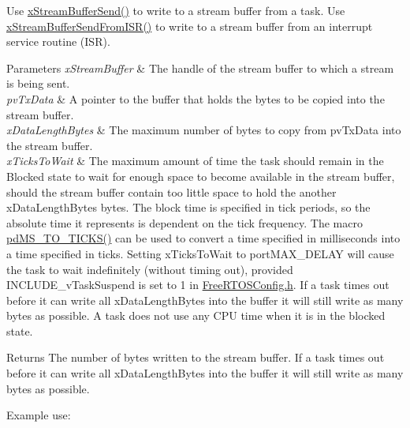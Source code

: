 \begin{DoxyPre}
\begin{DoxyPre}   Use \hyperlink{stream__buffer_8h_a35cdf3b6bf677086b9128782f762499d}{xStreamBufferSend()} to write to a stream buffer from a task.  Use
   \hyperlink{stream__buffer_8h_a1dab226e99230e01e79bc2b5c0605e44}{xStreamBufferSendFromISR()} to write to a stream buffer from an interrupt
   service routine (ISR).\end{DoxyPre}
\end{DoxyPre}



\begin{DoxyPre}
\begin{DoxyPre}   
\begin{DoxyParams}{Parameters}
{\em xStreamBuffer} & The handle of the stream buffer to which a stream is
   being sent.\\
\hline
{\em pvTxData} & A pointer to the buffer that holds the bytes to be copied
   into the stream buffer.\\
\hline
{\em xDataLengthBytes} & The maximum number of bytes to copy from pvTxData
   into the stream buffer.\\
\hline
{\em xTicksToWait} & The maximum amount of time the task should remain in the
   Blocked state to wait for enough space to become available in the stream
   buffer, should the stream buffer contain too little space to hold the
   another xDataLengthBytes bytes.  The block time is specified in tick periods,
   so the absolute time it represents is dependent on the tick frequency.  The
   macro \hyperlink{projdefs_8h_a353d0f62b82a402cb3db63706c81ec3f}{pdMS\_TO\_TICKS()} can be used to convert a time specified in milliseconds
   into a time specified in ticks.  Setting xTicksToWait to portMAX\_DELAY will
   cause the task to wait indefinitely (without timing out), provided
   INCLUDE\_vTaskSuspend is set to 1 in \hyperlink{_free_r_t_o_s_config_8h}{FreeRTOSConfig.h}.  If a task times out
   before it can write all xDataLengthBytes into the buffer it will still write
   as many bytes as possible.  A task does not use any CPU time when it is in
   the blocked state.\\
\hline
\end{DoxyParams}
\begin{DoxyReturn}{Returns}
The number of bytes written to the stream buffer.  If a task times
   out before it can write all xDataLengthBytes into the buffer it will still
   write as many bytes as possible.
\end{DoxyReturn}
Example use:


\end{DoxyPre}
\end{DoxyPre}
